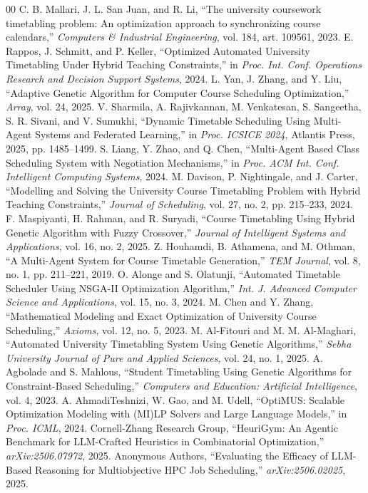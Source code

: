 \documentclass[conference]{IEEEtran}
\begin{document}
\begin{thebibliography}{00}
 C. B. Mallari, J. L. San Juan, and R. Li, ``The university coursework timetabling problem: An optimization approach to synchronizing course calendars,'' \textit{Computers \& Industrial Engineering}, vol. 184, art. 109561, 2023.
 E. Rappos, J. Schmitt, and P. Keller, ``Optimized Automated University Timetabling Under Hybrid Teaching Constraints,'' in \textit{Proc. Int. Conf. Operations Research and Decision Support Systems}, 2024.
 L. Yan, J. Zhang, and Y. Liu, ``Adaptive Genetic Algorithm for Computer Course Scheduling Optimization,'' \textit{Array}, vol. 24, 2025.
 V. Sharmila, A. Rajivkannan, M. Venkatesan, S. Sangeetha, S. R. Sivani, and V. Sumukhi, ``Dynamic Timetable Scheduling Using Multi-Agent Systems and Federated Learning,'' in \textit{Proc. ICSICE 2024}, Atlantis Press, 2025, pp. 1485--1499.
 S. Liang, Y. Zhao, and Q. Chen, ``Multi-Agent Based Class Scheduling System with Negotiation Mechanisms,'' in \textit{Proc. ACM Int. Conf. Intelligent Computing Systems}, 2024.
 M. Davison, P. Nightingale, and J. Carter, ``Modelling and Solving the University Course Timetabling Problem with Hybrid Teaching Constraints,'' \textit{Journal of Scheduling}, vol. 27, no. 2, pp. 215--233, 2024.
 F. Maspiyanti, H. Rahman, and R. Suryadi, ``Course Timetabling Using Hybrid Genetic Algorithm with Fuzzy Crossover,'' \textit{Journal of Intelligent Systems and Applications}, vol. 16, no. 2, 2025.
 Z. Houhamdi, B. Athamena, and M. Othman, ``A Multi-Agent System for Course Timetable Generation,'' \textit{TEM Journal}, vol. 8, no. 1, pp. 211--221, 2019.
 O. Alonge and S. Olatunji, ``Automated Timetable Scheduler Using NSGA-II Optimization Algorithm,'' \textit{Int. J. Advanced Computer Science and Applications}, vol. 15, no. 3, 2024.
 M. Chen and Y. Zhang, ``Mathematical Modeling and Exact Optimization of University Course Scheduling,'' \textit{Axioms}, vol. 12, no. 5, 2023.
 M. Al-Fitouri and M. M. Al-Maghari, ``Automated University Timetabling System Using Genetic Algorithms,'' \textit{Sebha University Journal of Pure and Applied Sciences}, vol. 24, no. 1, 2025.
 A. Agbolade and S. Mahlous, ``Student Timetabling Using Genetic Algorithms for Constraint-Based Scheduling,'' \textit{Computers and Education: Artificial Intelligence}, vol. 4, 2023.
 A. AhmadiTeshnizi, W. Gao, and M. Udell, ``OptiMUS: Scalable Optimization Modeling with (MI)LP Solvers and Large Language Models,'' in \textit{Proc. ICML}, 2024.
 Cornell-Zhang Research Group, ``HeuriGym: An Agentic Benchmark for LLM-Crafted Heuristics in Combinatorial Optimization,'' \textit{arXiv:2506.07972}, 2025.
 Anonymous Authors, ``Evaluating the Efficacy of LLM-Based Reasoning for Multiobjective HPC Job Scheduling,'' \textit{arXiv:2506.02025}, 2025.
\end{thebibliography}
\end{document}
